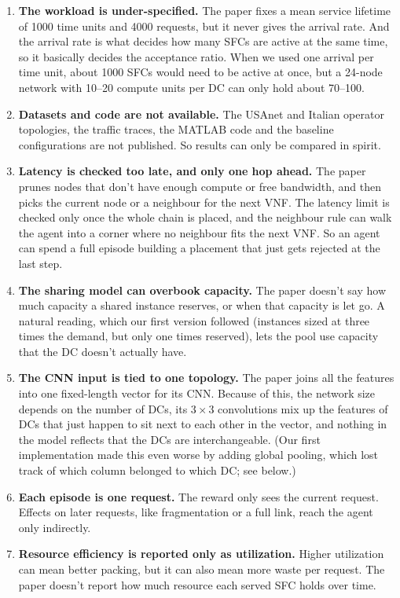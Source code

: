 \documentclass[11pt,a4paper]{article}
\begin{document}
\begin{enumerate}[label=\textbf{L\arabic*.}]
  \item \textbf{The workload is under-specified.} The paper fixes a mean
  service lifetime of 1000 time units and 4000 requests, but it never gives
  the arrival rate. And the arrival rate is what decides how many SFCs are
  active at the same time, so it basically decides the acceptance ratio. When we
  used one arrival per time unit, about 1000 SFCs would need to be active at
  once, but a 24-node network with 10--20 compute units per DC can only hold
  about 70--100.
  \item \textbf{Datasets and code are not available.} The USAnet and Italian
  operator topologies, the traffic traces, the MATLAB code and the baseline
  configurations are not published. So results can only be compared in spirit.
  \item \textbf{Latency is checked too late, and only one hop ahead.} The paper
  prunes nodes that don't have enough compute or free bandwidth, and then picks
  the current node or a neighbour for the next VNF. The latency limit is checked
  only once the whole chain is placed, and the neighbour rule can walk the agent
  into a corner where no neighbour fits the next VNF. So an agent can spend a
  full episode building a placement that just gets rejected at the last step.
  \item \textbf{The sharing model can overbook capacity.} The paper doesn't say
  how much capacity a shared instance reserves, or when that capacity is let go.
  A natural reading, which our first version followed (instances sized at three
  times the demand, but only one times reserved), lets the pool use capacity that
  the DC doesn't actually have.
  \item \textbf{The CNN input is tied to one topology.} The paper joins all the
  features into one fixed-length vector for its CNN. Because of this, the network
  size depends on the number of DCs, its $3\times3$ convolutions mix up the
  features of DCs that just happen to sit next to each other in the vector, and
  nothing in the model reflects that the DCs are interchangeable. (Our first
  implementation made this even worse by adding global pooling, which lost track
  of which column belonged to which DC; see below.)
  \item \textbf{Each episode is one request.} The reward only sees the current
  request. Effects on later requests, like fragmentation or a full link, reach
  the agent only indirectly.
  \item \textbf{Resource efficiency is reported only as utilization.} Higher
  utilization can mean better packing, but it can also mean more waste per
  request. The paper doesn't report how much resource each served SFC holds over
  time.
\end{enumerate}
\end{document}
